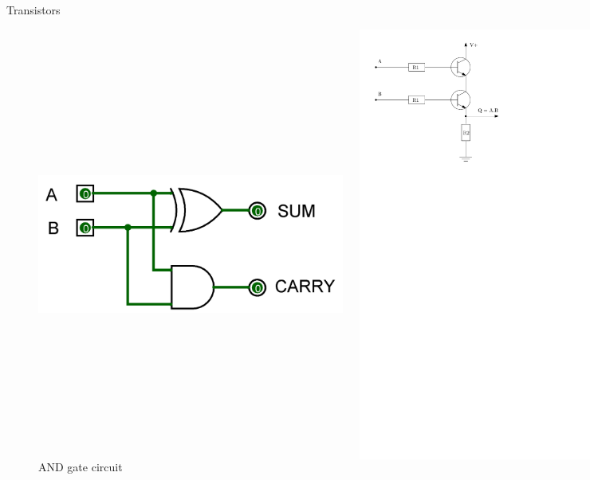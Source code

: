 \documentclass[xcolor=dvipsnames]{beamer}
\begin{document}
\begin{frame}{Transistors}
\begin{figure}
  \centering
  \begin{columns}
    \centering
    \caption {Half adder}
    \includegraphics[width=0.9\textwidth]{half_adder}
    \centering
    \caption {AND gate circuit}
    \includegraphics[width=0.9\textwidth]{and_gate_circuit}
  \end{columns}
\end{figure}
\end{frame}
\end{document}

